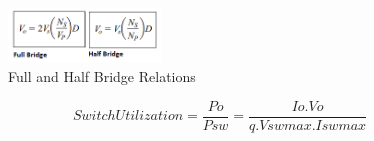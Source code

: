 \documentclass[twocolumn, ]{article}
\begin{document}
\begin{figure}[!ht]
	\includegraphics[width=1.6in,height=.8in]{fullandhalfinout.png}
	\caption{Full and Half Bridge Relations}
\end{figure}


\begin{equation}
Switch Utilization= \frac{Po}{Psw}=\frac{Io.Vo}{q.Vswmax.Iswmax}
\end{equation}
\end{document}
